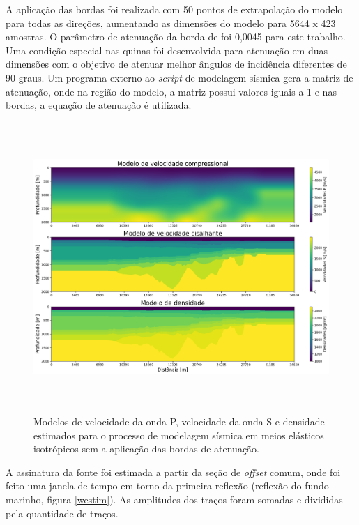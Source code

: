 \documentclass[
	12pt,				%
	openright,			%
	oneside,			%
	a4paper,			%
	english,			%
	brazil				%
	]{abntex2}
\begin{document}
	A aplicação das bordas foi realizada com 50 pontos de extrapolação do modelo para todas as direções, aumentando as dimensões do modelo para 5644 x 423 amostras. O parâmetro de atenuação da borda de  foi 0,0045 para este trabalho. Uma condição especial nas quinas foi desenvolvida para atenuação em duas dimensões com o objetivo de atenuar melhor ângulos de incidência diferentes de 90 graus. Um programa externo ao \textit{script} de modelagem sísmica gera a matriz de atenuação, onde na região do modelo, a matriz possui valores iguais a 1 e nas bordas, a equação de atenuação é utilizada.

	\begin{figure}[htp!]
		\centering
		\includegraphics[width=16cm,height=11cm]{../imagens/ModelosInput.png}
		\caption{Modelos de velocidade da onda P, velocidade da onda S e densidade estimados para o processo de modelagem sísmica em meios elásticos isotrópicos sem a aplicação das bordas de atenuação.}
		\label{modeloInput}
	\end{figure}

	\newpage
	A assinatura da fonte foi estimada a partir da seção de \textit{offset} comum, onde foi feito uma janela de tempo em torno da primeira reflexão (reflexão do fundo marinho, figura \ref{westim}). As amplitudes dos traços foram somadas e divididas pela quantidade de traços.
\end{document}
